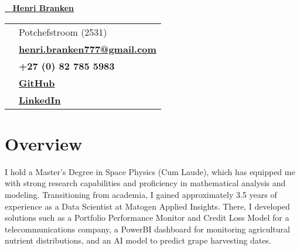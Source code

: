 \documentclass[a4paper,10pt]{article}
\begin{document}
\begin{center}
	{\Huge\textbf{\href{https://henribranken.github.io/MyCV/}{\faHandPointer~ Henri Branken}}}\\[0.5cm]
\end{center}
\begin{minipage}{0.7\textwidth}
	\begin{tcolorbox}[
		colback=gray!10, %
		colframe=teal,   %
		sharp corners=south, %
		boxrule=1pt, %
		width=0.8\textwidth,
		left=10pt, right=10pt, %
		]
		\begin{tabularx}{\textwidth}{c X}
			\faHome & Potchefstroom (2531) \\[0.2cm]
			\faEnvelope & \href{mailto:henri.branken777@gmail.com}{\textbf{henri.branken777@gmail.com}} \\[0.2cm]
			\faPhone & \textbf{+27 (0) 82 785 5983} \\[0.2cm]
			\faGithub & \href{https://github.com/HenriBranken}{\textbf{GitHub}} \\[0.2cm]
			\faLinkedin & \href{https://www.linkedin.com/in/henri-branken-1423a2153/}{\textbf{LinkedIn}}
		\end{tabularx}
	\end{tcolorbox}
\end{minipage}
\hfill
\begin{minipage}{0.3\textwidth}
\end{minipage}

\section*{Overview}
I hold a Master's Degree in Space Physics (Cum Laude), which has equipped me with strong research capabilities and proficiency in mathematical analysis and modeling. Transitioning from academia, I gained approximately 3.5 years of experience as a Data Scientist at Matogen Applied Insights. There, I developed solutions such as a Portfolio Performance Monitor and Credit Loss Model for a telecommunications company, a PowerBI dashboard for monitoring agricultural nutrient distributions, and an AI model to predict grape harvesting dates.
\end{document}
